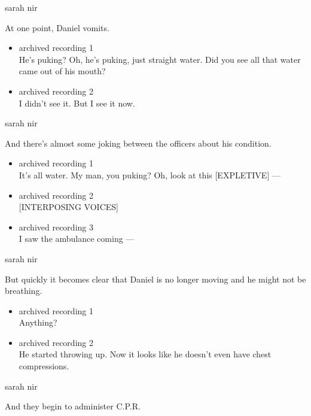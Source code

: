 sarah nir

At one point, Daniel vomits.

\begin{itemize}
\item
  archived recording 1\\
  He's puking? Oh, he's puking, just straight water. Did you see all
  that water came out of his mouth?
\item
  archived recording 2\\
  I didn't see it. But I see it now.
\end{itemize}

sarah nir

And there's almost some joking between the officers about his condition.

\begin{itemize}
\item
  archived recording 1\\
  It's all water. My man, you puking? Oh, look at this {[}EXPLETIVE{]}
  ---
\item
  archived recording 2\\
  {[}INTERPOSING VOICES{]}
\item
  archived recording 3\\
  I saw the ambulance coming ---
\end{itemize}

sarah nir

But quickly it becomes clear that Daniel is no longer moving and he
might not be breathing.

\begin{itemize}
\item
  archived recording 1\\
  Anything?
\item
  archived recording 2\\
  He started throwing up. Now it looks like he doesn't even have chest
  compressions.
\end{itemize}

sarah nir

And they begin to administer C.P.R.

